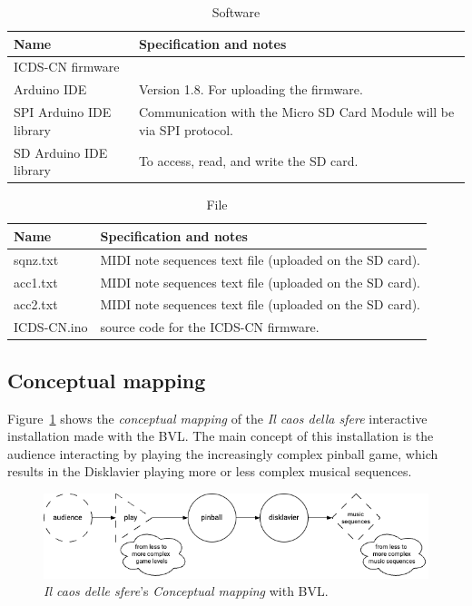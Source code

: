 \begin{longtable}{|p{}|p{}|}
    \caption{Software} \label{tab:a-data-hardware} \\
    \hline
    \textbf{Name} & \textbf{Specification and notes} \\
    \hline
    ICDS-CN firmware & \scriptsize \\
    \hline
    Arduino IDE & \scriptsize Version 1.8. For uploading the firmware.\\
    \hline
    SPI Arduino IDE library & \scriptsize Communication with the Micro SD Card Module will be via SPI protocol.  \\
    \hline
    SD Arduino IDE library & \scriptsize To access, read, and write the SD card.\\
    \hline
\end{longtable}

\begin{longtable}{|p{}|p{}|}
    \caption{File} \label{tab:a-data-hardware} \\
    \hline
    \textbf{Name} & \textbf{Specification and notes} \\
    \hline
    sqnz.txt & \scriptsize MIDI note sequences text file (uploaded on the SD card).\\
    \hline
    acc1.txt & \scriptsize MIDI note sequences text file (uploaded on the SD card).  \\
    \hline
    acc2.txt & \scriptsize MIDI note sequences text file (uploaded on the SD card).\\
    \hline
    ICDS-CN.ino & \scriptsize source code for the ICDS-CN firmware.\\
    \hline
\end{longtable}

\subsection*{Conceptual mapping}
Figure~\ref{fig:ab-mapping-conceptual} shows the \textit{conceptual mapping} of the \textit{Il caos della sfere} interactive installation made with the BVL. The main concept of this installation is the audience interacting by playing the increasingly complex pinball game, which results in the Disklavier playing more or less complex musical sequences.

\begin{figure}[!h]
    \centering
    \includegraphics[width=\linewidth]{chapters/appendix/b/image/graphb-mapping-concept.png}
    \caption{\textit{Il caos delle sfere}’s \textit{Conceptual mapping} with BVL.}
    \label{fig:ab-mapping-conceptual}
\end{figure}

